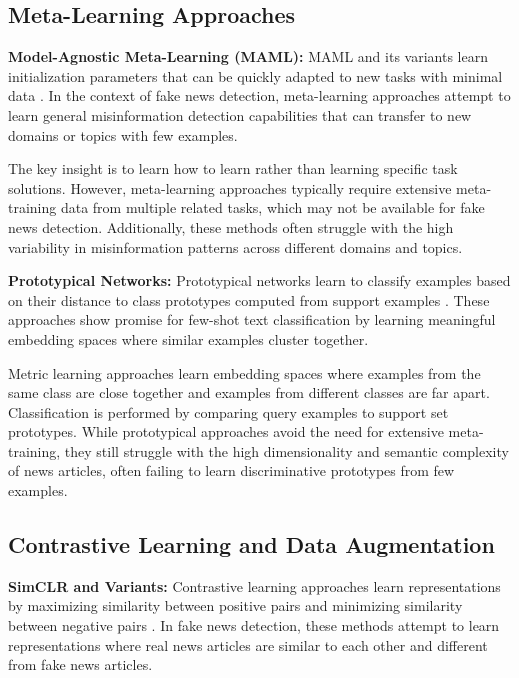 \subsection{Meta-Learning Approaches}

\textbf{Model-Agnostic Meta-Learning (MAML):} MAML and its variants learn initialization parameters that can be quickly adapted to new tasks with minimal data \cite{finn2017model, bansal2020self}. In the context of fake news detection, meta-learning approaches attempt to learn general misinformation detection capabilities that can transfer to new domains or topics with few examples.

The key insight is to learn how to learn rather than learning specific task solutions. However, meta-learning approaches typically require extensive meta-training data from multiple related tasks, which may not be available for fake news detection. Additionally, these methods often struggle with the high variability in misinformation patterns across different domains and topics.

\textbf{Prototypical Networks:} Prototypical networks learn to classify examples based on their distance to class prototypes computed from support examples \cite{snell2017prototypical, gao2019fewrel}. These approaches show promise for few-shot text classification by learning meaningful embedding spaces where similar examples cluster together.

Metric learning approaches learn embedding spaces where examples from the same class are close together and examples from different classes are far apart. Classification is performed by comparing query examples to support set prototypes. While prototypical approaches avoid the need for extensive meta-training, they still struggle with the high dimensionality and semantic complexity of news articles, often failing to learn discriminative prototypes from few examples.

\subsection{Contrastive Learning and Data Augmentation}

\textbf{SimCLR and Variants:} Contrastive learning approaches learn representations by maximizing similarity between positive pairs and minimizing similarity between negative pairs \cite{chen2020simple, gao2021simcse}. In fake news detection, these methods attempt to learn representations where real news articles are similar to each other and different from fake news articles.

